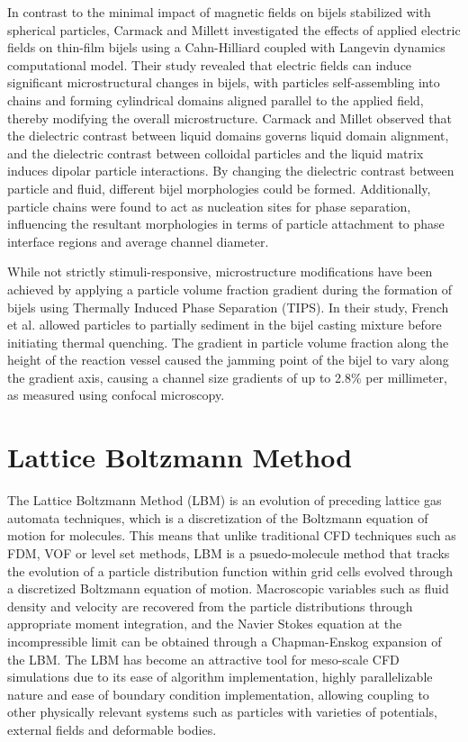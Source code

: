 In contrast to the minimal impact of magnetic fields on bijels stabilized with spherical particles, Carmack and Millett investigated the effects of 
applied electric fields on thin-film bijels using a Cahn-Hilliard coupled with Langevin dynamics computational model. \cite{carmack_tuning_2018} 
Their study revealed that electric fields can induce significant microstructural changes in bijels, with particles self-assembling into chains and forming 
cylindrical domains aligned parallel to the applied field, thereby modifying the overall microstructure. Carmack and Millet observed that the dielectric contrast 
between liquid domains governs liquid domain alignment, and the dielectric contrast between colloidal particles and the liquid matrix induces dipolar particle 
interactions. By changing the dielectric contrast between particle and fluid, different bijel morphologies could be formed. Additionally, particle chains were found to 
act as nucleation sites for phase separation, influencing the resultant morphologies in terms of particle attachment to phase interface regions and average 
channel diameter. 

While not strictly stimuli-responsive, microstructure modifications have been achieved by applying a particle volume fraction gradient during the formation of 
bijels using Thermally Induced Phase Separation (TIPS). \cite{french_bicontinuous_2022} In their study, French et al. allowed particles to partially sediment in the bijel casting mixture
before initiating thermal quenching. The gradient in particle volume fraction along the height of the reaction vessel caused the jamming point of the bijel
to vary along the gradient axis, causing a channel size gradients of up to 2.8\% per millimeter, as measured using confocal microscopy.

\section{Lattice Boltzmann Method}

The Lattice Boltzmann Method (LBM) is an evolution of preceding lattice gas automata techniques, which is a discretization of the Boltzmann equation of motion for 
molecules. This means that unlike traditional CFD techniques such as FDM, VOF or level set methods, LBM is a psuedo-molecule method that tracks the evolution of a 
particle distribution function within grid cells evolved through a discretized Boltzmann equation of motion. Macroscopic variables such as fluid density and 
velocity are recovered from the particle distributions through appropriate moment integration, and the Navier Stokes equation at the incompressible limit can be 
obtained through a Chapman-Enskog expansion of the LBM. The LBM has become an attractive tool for meso-scale CFD simulations due to its ease of algorithm 
implementation, highly parallelizable nature and ease of boundary condition implementation, allowing coupling to other physically relevant systems such as 
particles with varieties of potentials, external fields and deformable bodies.

